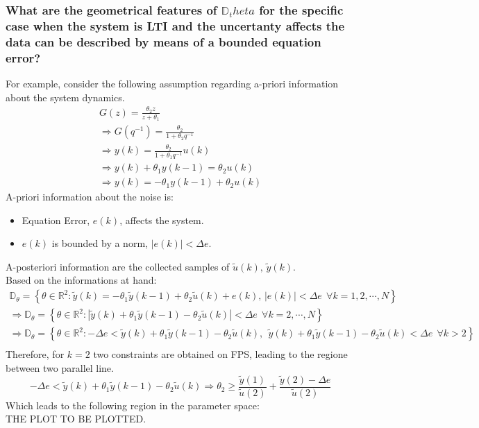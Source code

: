 \subsubsection{What are the geometrical features of \(\mathbb{D}_theta\) for the specific case when the system is LTI and the uncertanty affects the data can be described by means of a bounded equation error?}
For example, consider the following assumption regarding a-priori information about the system dynamics.
\[
\begin{array}{l}
G(z) = \frac{\theta_2 z}{z + \theta_1} \\ [2ex]
\Rightarrow 
G(q^{-1}) = \frac{\theta_2}{1 + \theta_2 q^{-1}} \\ [2ex]
\Rightarrow 
y(k) = \frac{\theta_2}{1 + \theta_1 q^{-1}} u(k) \\ [2ex]
\Rightarrow 
y(k) + \theta_1 y(k-1) = \theta_2 u(k) \\[2ex]
\Rightarrow
y(k) = -\theta_1y(k-1) +\theta_2 u(k)
\end{array}
\]
A-priori information about the noise is:
\begin{itemize}
    \item Equation Error, \(e(k)\), affects the system.
    \item \(e(k)\) is bounded by a norm, \(|e(k)| < \Delta e\).
\end{itemize}

A-posteriori information are the collected samples of \(\tilde{u}(k), \, \tilde{y}(k)\).\\

Based on the informations at hand:
\[
\begin{array}{c}
\mathbb{D}_\theta = 
\left\{
\theta \in \mathbb{R}^2 : \tilde{y}(k) = - \theta_1\tilde{y}(k-1) + \theta_2 \tilde{u}(k) + e(k), \, |e(k)|<\Delta e \:\: \forall k= 1,2,\cdots,N 
\right\}\\[2ex]
\Rightarrow
\mathbb{D}_\theta = 
\left\{
\theta \in \mathbb{R}^2 : |\tilde{y}(k) + \theta_1\tilde{y}(k-1) - \theta_2 \tilde{u}(k) |<\Delta e \:\: \forall k= 2,\cdots,N 
\right\}\\[2ex]
\Rightarrow
\mathbb{D}_\theta = 
\left\{
\theta \in \mathbb{R}^2 : -\Delta e < \tilde{y}(k) + \theta_1\tilde{y}(k-1) - \theta_2 \tilde{u}(k) ,\:\:  \tilde{y}(k) + \theta_1\tilde{y}(k-1) - \theta_2 \tilde{u}(k) <\Delta e \:\: \forall k>2
\right\}\\[2ex]
\end{array}
\]
Therefore, for \(k=2\) two constraints are obtained on FPS, leading to the regione between two parallel line. 
\[
-\Delta e <\tilde{y}(k) + \theta_1\tilde{y}(k-1) - \theta_2 \tilde{u}(k) \Rightarrow
\theta_2\geq \frac{\tilde{y}(1)}{\tilde{u}(2)} + \frac{\tilde{y}(2) - \Delta e}{\tilde{u}(2)}
\]
Which leads to the following region in the parameter space:\\
THE PLOT TO BE PLOTTED.\\

